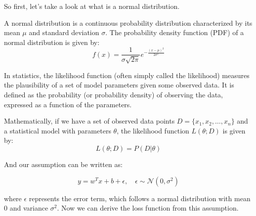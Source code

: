 So first, let's take a look at what is a normal distribution.

\begin{definition}
    
A normal distribution is a continuous probability distribution characterized by its mean \(\mu\) and standard deviation \(\sigma\). The probability density function (PDF) of a normal distribution is given by:
\[
f(x) = \frac{1}{\sigma \sqrt{2\pi}} e^{-\frac{(x - \mu)^2}{2\sigma^2}}
\]

\end{definition}

\begin{definition}
In statistics, the likelihood function (often simply called the likelihood) measures the plausibility of a set of model parameters given some observed data. It is defined as the probability (or probability density) of observing the data, expressed as a function of the parameters.

Mathematically, if we have a set of observed data points \(D = \{x_1, x_2, \ldots, x_n\}\) and a statistical model with parameters \(\theta\), the likelihood function \(L(\theta; D)\) is given by:
\[
L(\theta; D) = P(D | \theta)
\]
\end{definition}

And our assumption can be written as:

\[
y = w^Tx + b + \epsilon, \quad \epsilon \sim \mathcal{N}(0, \sigma^2)
\]

where \(\epsilon\) represents the error term, which follows a normal distribution with mean 0 and variance \(\sigma^2\). Now we can derive the loss function from this assumption.

